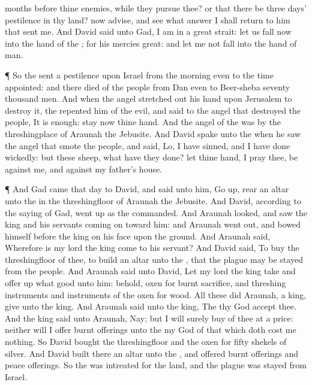 {months
before thine
enemies, while they
pursue thee? or that there be
three
days’
pestilence in thy
land? now
advise, and
see what
answer I shall
return to him that
sent me.
And
David
said unto
Gad, I am in a
great
strait: let us
fall now into the
hand of the
{}; for his
mercies
{}
great: and let me not
fall into the
hand of
man.
\par }{\PP {}¶ So the
{}
sent a
pestilence upon
Israel from the
morning even to the
time
appointed: and there
died of the
people from
Dan even to
Beer-sheba
seventy
thousand
men.
And when the
angel stretched
out his
hand upon
Jerusalem to
destroy it, the
{}
repented him of the
evil, and
said to the
angel that
destroyed the
people, It is
enough:
stay now thine
hand. And the
angel of the
{} was by the
threshingplace of
Araunah the
Jebusite.
And
David
spake unto the
{} when he
saw the
angel that
smote the
people, and
said, Lo, I have
sinned, and I have done
wickedly: but these
sheep, what have they
done? let thine
hand, I pray thee, be against me, and against my
father’s
house.
\par }{\PP {}¶ And
Gad
came that
day to
David, and
said unto him, Go
up,
rear an
altar unto the
{} in the
threshingfloor of
Araunah the
Jebusite.
And
David, according to the
saying of
Gad, went
up as the
{}
commanded.
And
Araunah
looked, and
saw the
king and his
servants coming
on toward him: and
Araunah went
out, and
bowed himself before the
king on his
face upon the
ground.
And
Araunah
said, Wherefore is my
lord the
king
come to his
servant? And
David
said, To
buy the
threshingfloor of thee, to
build an
altar unto the
{}, that the
plague may be
stayed from the
people.
And
Araunah
said unto
David, Let my
lord the
king
take and offer
up what
{}
good unto
him:
behold,
{}
oxen for burnt
sacrifice, and threshing
instruments and
{}
instruments of the
oxen for
wood.
All these
{} did
Araunah,
{} a
king,
give unto the
king. And
Araunah
said unto the
king, The
{} thy
God
accept thee.
And the
king
said unto
Araunah, Nay; but I will
surely
buy
{} of thee at a
price: neither will I
offer burnt
offerings unto the
{} my
God of that which doth cost me
nothing. So
David
bought the
threshingfloor and the
oxen for
fifty
shekels of
silver.
And
David
built there an
altar unto the
{}, and
offered burnt
offerings and peace
offerings. So the
{} was
intreated for the
land, and the
plague was
stayed from
Israel.
\par }
